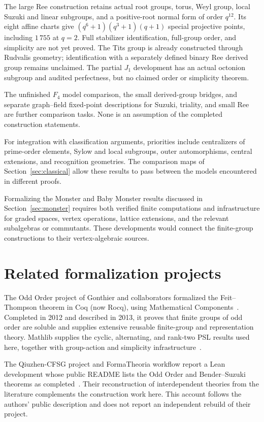 \documentclass[11pt]{article}
\numberwithin{equation}{section}
\theoremstyle{definition}
\begin{document}
The large Ree construction retains actual root groups, torus, Weyl
group, local Suzuki and linear subgroups, and a positive-root normal
form of order $q^{12}$. Its eight affine charts give
$(q^6+1)(q^3+1)(q+1)$ special projective points, including $1\,755$ at
$q=2$. Full stabilizer identification, full-group order, and simplicity
are not yet proved. The Tits group is already constructed through
Rudvalis geometry; identification with a separately defined binary Ree
derived group remains unclaimed. The partial $J_1$ development has an
actual octonion subgroup and audited perfectness, but no claimed order
or simplicity theorem.

The unfinished $F_4$ model comparison, the small derived-group bridges,
and separate graph--field fixed-point descriptions for Suzuki, triality,
and small Ree are further comparison tasks. None is an assumption of
the completed construction statements.


For integration with classification arguments, priorities include
centralizers of prime-order elements, Sylow and local subgroups, outer
automorphisms, central extensions, and recognition geometries. The
comparison maps of Section~\ref{sec:classical} allow these results to
pass between the models encountered in different proofs.

Formalizing the Monster and Baby Monster results discussed in
Section~\ref{sec:monster} requires both verified finite computations and
infrastructure for graded spaces, vertex operations, lattice extensions,
and the relevant subalgebras or commutants. These developments would
connect the finite-group constructions to their vertex-algebraic
sources.

\section{Related formalization projects}\label{sec:related}

The Odd Order project of Gonthier and collaborators formalized the
Feit--Thompson theorem in Coq (now Rocq), using Mathematical
Components~\cite{OddOrder}. Completed in 2012 and described in 2013,
it proves that finite groups of odd order are soluble and supplies
extensive reusable finite-group and representation theory.
Mathlib supplies the cyclic, alternating, and rank-two PSL results
used here, together with group-action and simplicity
infrastructure~\cite{Mathlib,MathlibGroups}.

The Qiuzhen-CFSG project and FormaTheoria workflow report a Lean
development whose public README lists the Odd Order and Bender--Suzuki
theorems as completed~\cite{FormaTheoria}. Their reconstruction of
interdependent theories from the literature complements the construction
work here. This account follows the authors' public description and does
not report an independent rebuild of their project.
\end{document}
